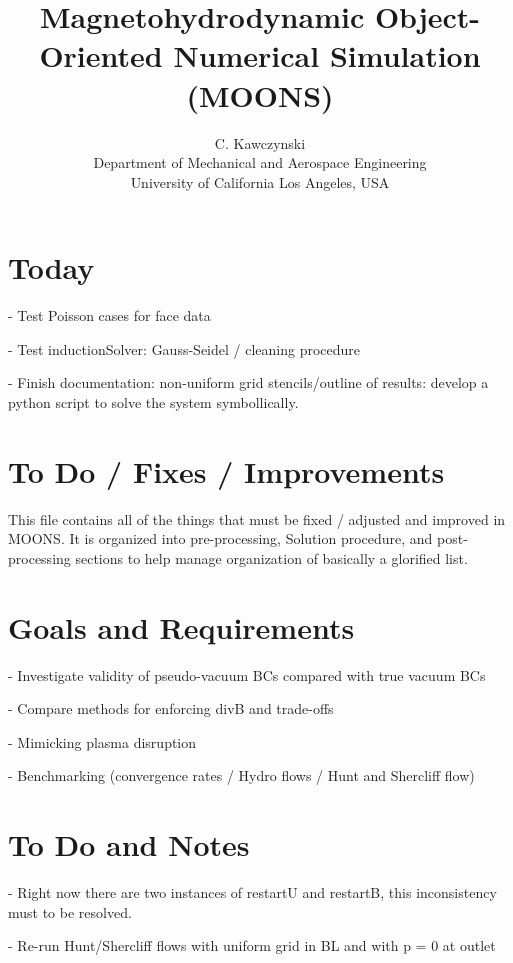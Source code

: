 \documentclass[11pt]{article}
\begin{document}
\doublespacing
\title{Magnetohydrodynamic Object-Oriented Numerical Simulation (MOONS)}
\author{C. Kawczynski \\
Department of Mechanical and Aerospace Engineering \\
University of California Los Angeles, USA\\
}
\maketitle

\section{Today}

- Test Poisson cases for face data

- Test inductionSolver: Gauss-Seidel / cleaning procedure

- Finish documentation: non-uniform grid stencils/outline of results: develop a python script to solve the system symbollically.

\section{To Do / Fixes / Improvements}
This file contains all of the things that must be fixed / adjusted and improved in MOONS. It is organized into pre-processing, Solution procedure, and post-processing sections to help manage organization of basically a glorified list.

\section{Goals and Requirements}

- Investigate validity of pseudo-vacuum BCs compared with true vacuum BCs

- Compare methods for enforcing divB and trade-offs

- Mimicking plasma disruption

- Benchmarking (convergence rates / Hydro flows / Hunt and Shercliff flow)

\section{To Do and Notes}
- Right now there are two instances of restartU and restartB, this inconsistency must to be resolved.

- Re-run Hunt/Shercliff flows with uniform grid in BL and with p = 0 at outlet
\end{document}
